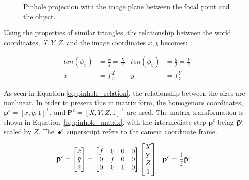 \begin{figure}[!htb]

    \caption{Pinhole projection with the image plane between the focal point and the object.}
    \label{fig:pinhole}
    
\end{figure}

Using the properties of similar triangles, the relationship between the world coordinates, $X,Y,Z$, and the image coordinates $x,y$ becomes:

\begin{align}
    tan(\phi_x) &= \frac{x}{f} = \frac{X}{Z} & tan(\phi_y) &= \frac{y}{f} = \frac{Y}{Z} \label{eq:pinhole_tan_relation} \\
    x &= f\frac{X}{Z} & y &=f\frac{Y}{Z}
    \label{eq:pinhole_relation}
\end{align}

As seen in Equation \eqref{eq:pinhole_relation}, the relationship between the sizes are nonlinear. In order to present this in matrix form, the homogenous coordinates, $\mathbf{p}^c=[x,y,1]^\top$, and $\mathbf{P}^c=[X,Y,Z,1]^\top$ are used. The matrix transformation is shown in Equation~\eqref{eq:pinhole_matrix}, with the intermediate step $\mathbf{p}^c$ being $\mathbf{\Tilde{p}}^c$ scaled by $Z$. The $\bullet^c$ superscript refers to the camera coordinate frame.

\begin{align}
    \mathbf{\Tilde{p}}^c &= \begin{bmatrix}
        \Tilde{x} \\ \Tilde{y} \\ \Tilde{z}
    \end{bmatrix} = \begin{bmatrix}
        f & 0 & 0 & 0 \\
        0 & f & 0 & 0 \\
        0 & 0 & 1 & 0
    \end{bmatrix}\begin{bmatrix}
        X \\ Y \\ Z \\ 1
    \end{bmatrix} &
    \mathbf{p}^c &= \frac{1}{\Tilde{z}}\mathbf{\Tilde{p}}^c
    \label{eq:pinhole_matrix}
\end{align}

